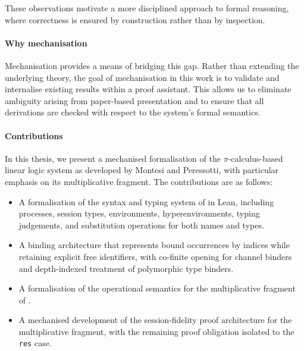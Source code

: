 These observations motivate a more disciplined approach to formal reasoning, where correctness is ensured by construction rather than by inspection.

\paragraph{Why mechanisation}
Mechanisation provides a means of bridging this gap. Rather than extending the underlying theory, the goal of mechanisation in this work is to validate and internalise existing results within a proof assistant. This allows us to eliminate ambiguity arising from paper-based presentation and to ensure that all derivations are checked with respect to the system's formal semantics.


\paragraph{Contributions}
In this thesis, we present a mechanised formalisation of the $\pi$-calculus-based linear logic system \pill{} as developed by Montesi and Peressotti, with particular emphasis on its multiplicative fragment. The contributions are as follows:

\begin{itemize}
    \item A formalisation of the syntax and typing system of \pill{} in Lean, including processes, session types, environments, hyperenvironments, typing judgements, and substitution operations for both names and types.
    \item A binding architecture that represents bound occurrences by indices while retaining explicit free identifiers, with co-finite opening for channel binders and depth-indexed treatment of polymorphic type binders.
    \item A formalisation of the operational semantics for the multiplicative fragment of \pill{}.
    \item A mechanised development of the session-fidelity proof architecture for the multiplicative fragment, with the remaining proof obligation isolated to the \texttt{res} case.
\end{itemize}

